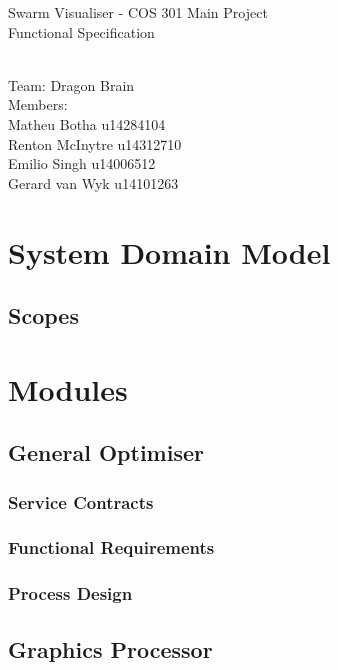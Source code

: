 \documentclass[11pt]{article}
\begin{document}
\begin{titlepage}

\begin{center}
\begin{huge}
Swarm Visualiser - COS 301 Main Project
\\
Functional Specification
\begin{small}
\\
Team: Dragon Brain
\\
Members:
\\
Matheu Botha u14284104
\\
Renton McInytre u14312710
\\
Emilio Singh u14006512
\\
Gerard van Wyk u14101263

\end{small}

\end{huge}
\end{center}
\end{titlepage}

\pagebreak

\tableofcontents

\pagebreak
\section{System Domain Model}
\subsection{Scopes}
\section{Modules}
\subsection{General Optimiser}
\subsubsection{Service Contracts}
\subsubsection{Functional Requirements}
\subsubsection{Process Design}

\subsection{Graphics Processor}
\end{document}
